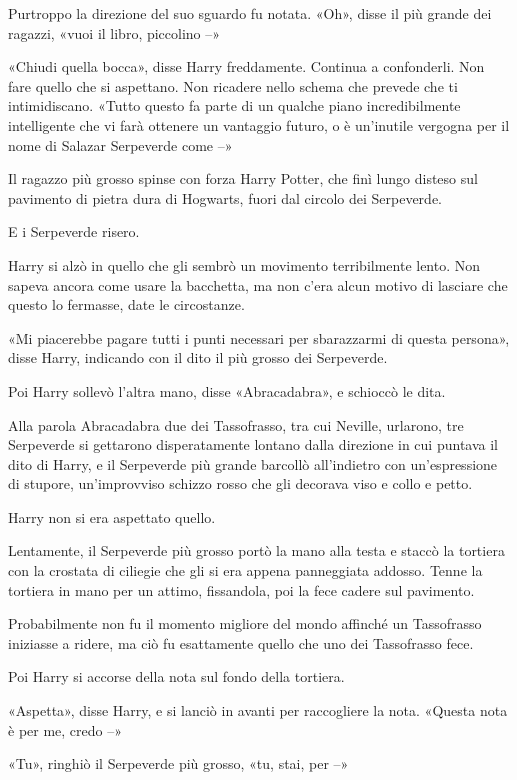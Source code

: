Purtroppo la direzione del suo sguardo fu notata. «Oh», disse il più grande dei ragazzi, «vuoi il libro, piccolino –»

«Chiudi quella bocca», disse Harry freddamente. Continua a confonderli. Non fare quello che si aspettano. Non ricadere nello schema che prevede che ti intimidiscano. «Tutto questo fa parte di un qualche piano incredibilmente intelligente che vi farà ottenere un vantaggio futuro, o è un’inutile vergogna per il nome di Salazar Serpeverde come –»

Il ragazzo più grosso spinse con forza Harry Potter, che finì lungo disteso sul pavimento di pietra dura di Hogwarts, fuori dal circolo dei Serpeverde.

E i Serpeverde risero.

Harry si alzò in quello che gli sembrò un movimento terribilmente lento. Non sapeva ancora come usare la bacchetta, ma non c’era alcun motivo di lasciare che questo lo fermasse, date le circostanze.

«Mi piacerebbe pagare tutti i punti necessari per sbarazzarmi di questa persona», disse Harry, indicando con il dito il più grosso dei Serpeverde.

Poi Harry sollevò l’altra mano, disse «Abracadabra», e schioccò le dita.

Alla parola Abracadabra due dei Tassofrasso, tra cui Neville, urlarono, tre Serpeverde si gettarono disperatamente lontano dalla direzione in cui puntava il dito di Harry, e il Serpeverde più grande barcollò all’indietro con un’espressione di stupore, un’improvviso schizzo rosso che gli decorava viso e collo e petto.

Harry non si era aspettato quello.

Lentamente, il Serpeverde più grosso portò la mano alla testa e staccò la tortiera con la crostata di ciliegie che gli si era appena panneggiata addosso. Tenne la tortiera in mano per un attimo, fissandola, poi la fece cadere sul pavimento.

Probabilmente non fu il momento migliore del mondo affinché un Tassofrasso iniziasse a ridere, ma ciò fu esattamente quello che uno dei Tassofrasso fece.

Poi Harry si accorse della nota sul fondo della tortiera.

«Aspetta», disse Harry, e si lanciò in avanti per raccogliere la nota. «Questa nota è per me, credo –»

«Tu», ringhiò il Serpeverde più grosso, «tu, stai, per –»

